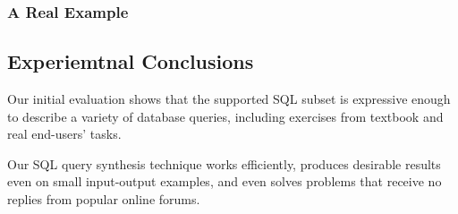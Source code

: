 \subsubsection{A Real Example}


\subsection{Experiemtnal Conclusions}

Our initial evaluation shows that the supported SQL subset is
expressive enough to describe a variety of database queries,
including exercises from textbook and real end-users' tasks.

Our SQL query synthesis technique works efficiently, produces
desirable results even on small  input-output examples, and
even solves problems that receive no replies from popular online
forums.


